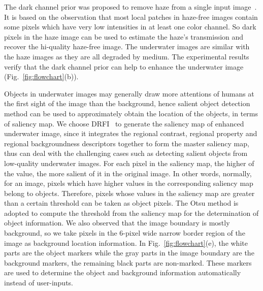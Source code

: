 \documentclass{article}
\begin{document}
The dark channel prior was proposed to remove haze from a single input image~\cite{he2011single}. It is based on the observation that most local patches in haze-free images contain some pixels which have very low intensities in at least one color channel. So dark pixels in the haze image can be used to estimate the haze's transmission and recover the hi-quality haze-free image. The underwater images are similar with the haze images as they are all degraded by medium. The experimental results verify that the dark channel prior can help to enhance the underwater image (Fig.~\ref{fig:flowchart}(b)).

Objects in underwater images may generally draw more attentions of humans at the first sight of the image than the background, hence salient object detection method can be used to approximately obtain the location of the objects, in terms of saliency map. We choose DRFI~\cite{jiang2013salient} to generate the saliency map of enhanced underwater image, since it integrates the regional contrast, regional property and regional backgroundness descriptors together to form the master saliency map, thus can deal with the challenging cases such as detecting salient objects from low-quality underwater images. For each pixel in the saliency map, the higher of the value, the more salient of it in the original image. In other words, normally, for an image, pixels which have higher values in the corresponding saliency map belong to objects. Therefore, pixels whose values in the saliency map are greater than a certain threshold can be taken as object pixels. The Otsu method is adopted to compute the threshold from the saliency map for the determination of object information. We also observed that the image boundary is mostly background, so we take pixels in the $6$-pixel wide narrow border region of the image as background location information. In Fig.~\ref{fig:flowchart}(e), the white parts are the object markers while the gray parts in the image boundary are the background markers, the remaining black parts are non-marked. These markers are used to determine the object and background information automatically instead of user-inputs.
\end{document}
